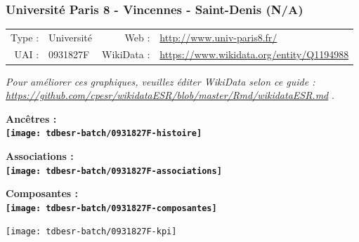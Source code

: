 \documentclass[12pt,french,]{article}
\begin{document}
\ifoddpage \fi ~\newpage  

\hypertarget{universituxe9-paris-8---vincennes---saint-denis-na}{%
\subsubsection{Université Paris 8 - Vincennes - Saint-Denis
(N/A)}\label{universituxe9-paris-8---vincennes---saint-denis-na}}

\begin{tabular*}{\textwidth}{rp{5cm}rl}  
\hline  
Type : & Université & Web : &\href{http://www.univ-paris8.fr/}{http://www.univ-paris8.fr/} \\  
UAI : & 0931827F & WikiData : & \href{https://www.wikidata.org/entity/Q1194988}{https://www.wikidata.org/entity/Q1194988} \\  
\hline  
\end{tabular*}

\textit{\scriptsize Pour améliorer ces graphiques, veuillez éditer WikiData selon ce guide :  \href{https://github.com/cpesr/wikidataESR/blob/master/Rmd/wikidataESR.md}{https://github.com/cpesr/wikidataESR/blob/master/Rmd/wikidataESR.md}}
.

\vspace{1cm}  
\begin{minipage}[b]{0.50\textwidth}\begin{center} \bf Ancêtres : \\  
\texttt{[image: tdbesr-batch/0931827F-histoire]} \end{center}\end{minipage}\begin{minipage}[b]{0.50\textwidth}\begin{center} \bf Associations : \\  
\texttt{[image: tdbesr-batch/0931827F-associations]} \end{center}\end{minipage}

\hrulefill

\begin{center} \bf Composantes : \\  
\texttt{[image: tdbesr-batch/0931827F-composantes]} \end{center}

\begin{center}\texttt{[image: tdbesr-batch/0931827F-kpi]} \end{center}\checkoddpage

\ifoddpage \fi ~\newpage  
\end{document}

